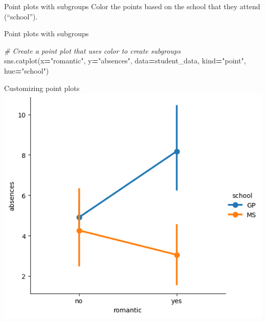 \documentclass[
  ignorenonframetext,
]{beamer}
\newenvironment{Shaded}{\begin{snugshade}}{\end{snugshade}}
\newcommand{\CommentTok}[1]{\textcolor[rgb]{0.56,0.35,0.01}{\textit{#1}}}
\newcommand{\NormalTok}[1]{#1}
\newcommand{\OperatorTok}[1]{\textcolor[rgb]{0.81,0.36,0.00}{\textbf{#1}}}
\newcommand{\StringTok}[1]{\textcolor[rgb]{0.31,0.60,0.02}{#1}}
\begin{document}
\begin{frame}{Point plots with subgroups}
\label{point-plots-with-subgroups-4}
Color the points based on the school that they attend (``school'').
\end{frame}

\begin{frame}[fragile]{Point plots with subgroups}
\label{point-plots-with-subgroups-5}

\begin{Shaded}
\begin{Highlighting}[]
\CommentTok{\# Create a point plot that uses color to create subgroups}
\NormalTok{sns.catplot(x}\OperatorTok{=}\StringTok{"romantic"}\NormalTok{, y}\OperatorTok{=}\StringTok{"absences"}\NormalTok{,}
\NormalTok{            data}\OperatorTok{=}\NormalTok{student\_data,}
\NormalTok{            kind}\OperatorTok{=}\StringTok{"point"}\NormalTok{,}
\NormalTok{            hue}\OperatorTok{=}\StringTok{"school"}\NormalTok{)}
\end{Highlighting}
\end{Shaded}
\end{frame}

\begin{frame}{Customizing point plots}
\label{customizing-point-plots-11}
\includegraphics{../images/im293.png}
\end{frame}
\end{document}
